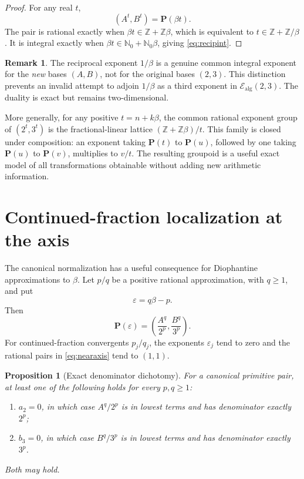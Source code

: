 \documentclass[11pt]{article}
\numberwithin{equation}{section}
\newtheorem{proposition}[theorem]{Proposition}
\theoremstyle{definition}
\newtheorem{remark}[theorem]{Remark}
\newcommand{\Z}{\mathbb{Z}}
\newcommand{\N}{\mathbb{N}}
\newcommand{\Pair}{\mathbf P}
\newcommand{\Ealg}{\mathcal E_{\mathrm{alg}}}
\begin{document}
\begin{proof}
For any real \(t\),
\[
       (A^t,B^t)=\Pair(\beta t).
\]
The pair is rational exactly when \(\beta t\in\Z+\Z\beta\), which is equivalent to \(t\in\Z+\Z/\beta\). It is integral exactly when \(\beta t\in\N_0+\N_0\beta\), giving \eqref{eq:recipint}.
\end{proof}

\begin{remark}
The reciprocal exponent \(1/\beta\) is a genuine common integral exponent for the \emph{new} bases \((A,B)\), not for the original bases \((2,3)\). This distinction prevents an invalid attempt to adjoin \(1/\beta\) as a third exponent in \(\Ealg(2,3)\). The duality is exact but remains two-dimensional.
\end{remark}

More generally, for any positive \(t=n+k\beta\), the common rational exponent group of \((2^t,3^t)\) is the fractional-linear lattice \((\Z+\Z\beta)/t\). This family is closed under composition: an exponent taking \(\Pair(t)\) to \(\Pair(u)\), followed by one taking \(\Pair(u)\) to \(\Pair(v)\), multiplies to \(v/t\). The resulting groupoid is a useful exact model of all transformations obtainable without adding new arithmetic information.

\section{Continued-fraction localization at the axis}

The canonical normalization has a useful consequence for Diophantine approximations to \(\beta\). Let \(p/q\) be a positive rational approximation, with \(q\ge1\), and put
\[
       \varepsilon=q\beta-p.
\]
Then
\begin{equation}\label{eq:nearaxis}
 \Pair(\varepsilon)=
 \left(\frac{A^q}{2^p},\frac{B^q}{3^p}\right).
\end{equation}
For continued-fraction convergents \(p_j/q_j\), the exponents \(\varepsilon_j\) tend to zero and the rational pairs in \eqref{eq:nearaxis} tend to \((1,1)\).

\begin{proposition}[Exact denominator dichotomy]\label{prop:denomdichotomy}
For a canonical primitive pair, at least one of the following holds for every \(p,q\ge1\):
\begin{enumerate}[label=\textup{(\roman*)}]
\item \(a_2=0\), in which case \(A^q/2^p\) is in lowest terms and has denominator exactly \(2^p\);
\item \(b_3=0\), in which case \(B^q/3^p\) is in lowest terms and has denominator exactly \(3^p\).
\end{enumerate}
Both may hold.
\end{proposition}
\end{document}
